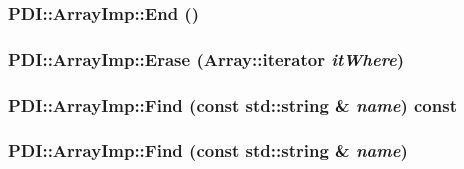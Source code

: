 \hypertarget{class_p_d_i_1_1_array_imp_f586e06b4c8aa7dabcabbbcbcbf31aa4}{
\subsubsection[{End}]{ PDI::ArrayImp::End ()}}
\label{class_p_d_i_1_1_array_imp_f586e06b4c8aa7dabcabbbcbcbf31aa4}


\hypertarget{class_p_d_i_1_1_array_imp_ece55ed8ebce204458461523b0d22ff7}{
\subsubsection[{Erase}]{ PDI::ArrayImp::Erase ({\bf Array::iterator} {\em itWhere})}}
\label{class_p_d_i_1_1_array_imp_ece55ed8ebce204458461523b0d22ff7}


\hypertarget{class_p_d_i_1_1_array_imp_835d5cd5b9a05f82b1007d14c52906b3}{
\subsubsection[{Find}]{ PDI::ArrayImp::Find (const std::string \& {\em name}) const}}
\label{class_p_d_i_1_1_array_imp_835d5cd5b9a05f82b1007d14c52906b3}


\hypertarget{class_p_d_i_1_1_array_imp_bbb8d18587fd1744554b8090b10b8ebb}{
\subsubsection[{Find}]{ PDI::ArrayImp::Find (const std::string \& {\em name})}}
\label{class_p_d_i_1_1_array_imp_bbb8d18587fd1744554b8090b10b8ebb}



